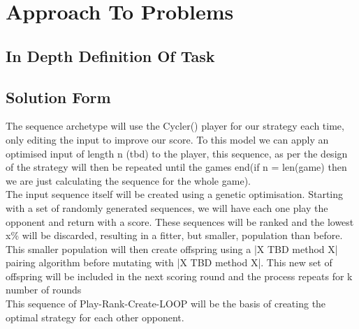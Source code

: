 
\chapter{Approach To Problems}\label{ch:approach}
    \section{In Depth Definition Of Task}
    \section{Solution Form}
The sequence archetype will use the Cycler() player for our strategy each time, only editing the input to improve our score. To this model we can apply an optimised input of length n (tbd) to the player, this sequence, as per the design of the strategy will then be repeated until the games end(if n = len(game) then we are just calculating the sequence for the whole game).\\

The input sequence itself will be created using a genetic optimisation. Starting with a set of randomly generated sequences, we will have each one play the opponent and return with a score. These sequences will be ranked and the lowest x\% will be discarded, resulting in a fitter, but smaller, population than before. This smaller population will then create offspring using a |X TBD method X| pairing algorithm before mutating with |X TBD method X|. This new set of offspring will be included in the next scoring round and the process repeats for k number of rounds\\

This sequence of Play-Rank-Create-LOOP will be the basis of creating the optimal strategy for each other opponent.

